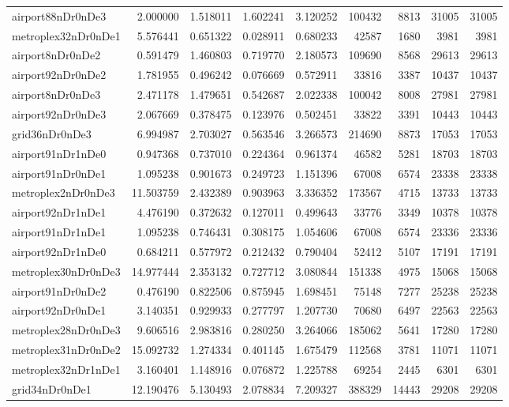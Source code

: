 \begin{longtable}{|l|r|r|r|r|r|r|r|r|}
airport88nDr0nDe3 & 2.000000 & 1.518011 & 1.602241 & 3.120252 & 100432 & 8813 & 31005 & 31005 \\
metroplex32nDr0nDe1 & 5.576441 & 0.651322 & 0.028911 & 0.680233 & 42587 & 1680 & 3981 & 3981 \\
airport8nDr0nDe2 & 0.591479 & 1.460803 & 0.719770 & 2.180573 & 109690 & 8568 & 29613 & 29613 \\
airport92nDr0nDe2 & 1.781955 & 0.496242 & 0.076669 & 0.572911 & 33816 & 3387 & 10437 & 10437 \\
airport8nDr0nDe3 & 2.471178 & 1.479651 & 0.542687 & 2.022338 & 100042 & 8008 & 27981 & 27981 \\
airport92nDr0nDe3 & 2.067669 & 0.378475 & 0.123976 & 0.502451 & 33822 & 3391 & 10443 & 10443 \\
grid36nDr0nDe3 & 6.994987 & 2.703027 & 0.563546 & 3.266573 & 214690 & 8873 & 17053 & 17053 \\
airport91nDr1nDe0 & 0.947368 & 0.737010 & 0.224364 & 0.961374 & 46582 & 5281 & 18703 & 18703 \\
airport91nDr0nDe1 & 1.095238 & 0.901673 & 0.249723 & 1.151396 & 67008 & 6574 & 23338 & 23338 \\
metroplex2nDr0nDe3 & 11.503759 & 2.432389 & 0.903963 & 3.336352 & 173567 & 4715 & 13733 & 13733 \\
airport92nDr1nDe1 & 4.476190 & 0.372632 & 0.127011 & 0.499643 & 33776 & 3349 & 10378 & 10378 \\
airport91nDr1nDe1 & 1.095238 & 0.746431 & 0.308175 & 1.054606 & 67008 & 6574 & 23336 & 23336 \\
airport92nDr1nDe0 & 0.684211 & 0.577972 & 0.212432 & 0.790404 & 52412 & 5107 & 17191 & 17191 \\
metroplex30nDr0nDe3 & 14.977444 & 2.353132 & 0.727712 & 3.080844 & 151338 & 4975 & 15068 & 15068 \\
airport91nDr0nDe2 & 0.476190 & 0.822506 & 0.875945 & 1.698451 & 75148 & 7277 & 25238 & 25238 \\
airport92nDr0nDe1 & 3.140351 & 0.929933 & 0.277797 & 1.207730 & 70680 & 6497 & 22563 & 22563 \\
metroplex28nDr0nDe3 & 9.606516 & 2.983816 & 0.280250 & 3.264066 & 185062 & 5641 & 17280 & 17280 \\
metroplex31nDr0nDe2 & 15.092732 & 1.274334 & 0.401145 & 1.675479 & 112568 & 3781 & 11071 & 11071 \\
metroplex32nDr1nDe1 & 3.160401 & 1.148916 & 0.076872 & 1.225788 & 69254 & 2445 & 6301 & 6301 \\
grid34nDr0nDe1 & 12.190476 & 5.130493 & 2.078834 & 7.209327 & 388329 & 14443 & 29208 & 29208 \\

\end{longtable}
